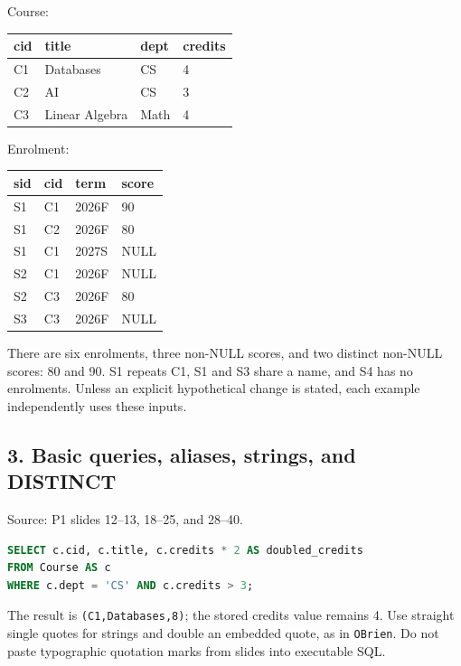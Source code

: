 Course:

\begin{longtable}[]{@{}llll@{}}
\toprule\noalign{}
cid & title & dept & credits \\
\midrule\noalign{}
\endhead
\bottomrule\noalign{}
\endlastfoot
C1 & Databases & CS & 4 \\
C2 & AI & CS & 3 \\
C3 & Linear Algebra & Math & 4 \\
\end{longtable}

Enrolment:

\begin{longtable}[]{@{}llll@{}}
\toprule\noalign{}
sid & cid & term & score \\
\midrule\noalign{}
\endhead
\bottomrule\noalign{}
\endlastfoot
S1 & C1 & 2026F & 90 \\
S1 & C2 & 2026F & 80 \\
S1 & C1 & 2027S & NULL \\
S2 & C1 & 2026F & NULL \\
S2 & C3 & 2026F & 80 \\
S3 & C3 & 2026F & NULL \\
\end{longtable}

There are six enrolments, three non-NULL scores, and two distinct non-NULL scores: 80 and 90. S1 repeats C1, S1 and S3 share a name, and S4 has no enrolments. Unless an explicit hypothetical change is stated, each example independently uses these inputs.

\subsection{3. Basic queries, aliases, strings, and DISTINCT}\label{06_sql_queries_en-basic-queries-aliases-strings-and-distinct}

Source: P1 slides 12--13, 18--25, and 28--40.

\Needspace{75pt}
\begin{lstlisting}[language=SQL]
SELECT c.cid, c.title, c.credits * 2 AS doubled_credits
FROM Course AS c
WHERE c.dept = 'CS' AND c.credits > 3;
\end{lstlisting}

The result is \texttt{(\allowbreak{}C1,\allowbreak{}Databases,\allowbreak{}8)\allowbreak{}}; the stored credits value remains 4. Use straight single quotes for strings and double an embedded quote, as in \texttt{\textquotesingle{}O\textquotesingle{}\textquotesingle{}Brien\textquotesingle{}}. Do not paste typographic quotation marks from slides into executable SQL.

